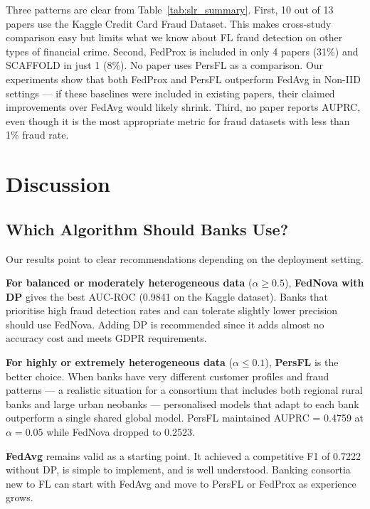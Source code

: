 \documentclass[12pt, a4paper]{article}
\begin{document}
Three patterns are clear from Table~\ref{tab:slr_summary}. First, 10 out of 13 papers use the Kaggle Credit Card Fraud Dataset. This makes cross-study comparison easy but limits what we know about FL fraud detection on other types of financial crime. Second, FedProx is included in only 4 papers (31\%) and SCAFFOLD in just 1 (8\%). No paper uses PersFL as a comparison. Our experiments show that both FedProx and PersFL outperform FedAvg in Non-IID settings --- if these baselines were included in existing papers, their claimed improvements over FedAvg would likely shrink. Third, no paper reports AUPRC, even though it is the most appropriate metric for fraud datasets with less than 1\% fraud rate.

\section{Discussion}
\label{sec:discussion}

\subsection{Which Algorithm Should Banks Use?}

Our results point to clear recommendations depending on the deployment setting.

\textbf{For balanced or moderately heterogeneous data} ($\alpha \geq 0.5$), \textbf{FedNova with DP} gives the best AUC-ROC (0.9841 on the Kaggle dataset). Banks that prioritise high fraud detection rates and can tolerate slightly lower precision should use FedNova. Adding DP is recommended since it adds almost no accuracy cost and meets GDPR requirements.

\textbf{For highly or extremely heterogeneous data} ($\alpha \leq 0.1$), \textbf{PersFL} is the better choice. When banks have very different customer profiles and fraud patterns --- a realistic situation for a consortium that includes both regional rural banks and large urban neobanks --- personalised models that adapt to each bank outperform a single shared global model. PersFL maintained AUPRC = 0.4759 at $\alpha = 0.05$ while FedNova dropped to 0.2523.

\textbf{FedAvg} remains valid as a starting point. It achieved a competitive F1 of 0.7222 without DP, is simple to implement, and is well understood. Banking consortia new to FL can start with FedAvg and move to PersFL or FedProx as experience grows.
\end{document}

